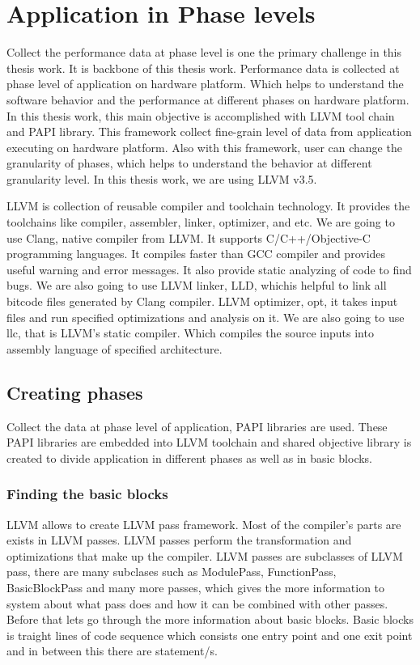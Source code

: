\section{Application in Phase levels}
Collect the performance data at phase level is one the primary challenge in this thesis work. It is backbone of this thesis work. Performance data is collected at phase level of application on hardware platform. Which helps to understand the software behavior and the performance at different phases on hardware platform. In this thesis work, this main objective is accomplished with LLVM tool chain and PAPI library. This framework collect fine-grain level of data from application executing on hardware platform. Also with this framework, user can change the granularity of phases, which helps to understand the behavior at different granularity level. In this thesis work, we are using LLVM v3.5. 

\par LLVM is collection of reusable compiler and toolchain technology. It provides the toolchains like compiler, assembler, linker, optimizer, and etc. We are going to use Clang, native compiler from LLVM. It supports C/C++/Objective-C programming languages. It compiles faster than GCC compiler and provides useful warning and error messages. It also provide static analyzing of code to find bugs. We are also going to use LLVM linker, LLD, whichis helpful to link all bitcode files generated by Clang compiler. LLVM optimizer, opt, it takes input files and run specified optimizations and analysis on it. We are also going to use llc, that is LLVM's static compiler. Which compiles the source inputs into assembly language of specified architecture. 

\subsection{Creating phases}
Collect the data at phase level of application, PAPI libraries are used. These PAPI libraries are embedded into LLVM toolchain and shared objective library is created to divide application in different phases as well as in basic blocks. 


\subsubsection{Finding the basic blocks}
LLVM allows to create LLVM pass framework. Most of the compiler's parts are exists in LLVM passes. LLVM passes perform the transformation and optimizations that make up the compiler. LLVM passes are subclasses of LLVM pass, there are many subclases such as ModulePass, FunctionPass, BasicBlockPass and many more passes, which gives the more information to system about what pass does and how it can be combined with other passes. Before that lets go through the more information about basic blocks. Basic blocks is traight lines of code sequence which consists one entry point and one exit point and in between this there are statement/s.

